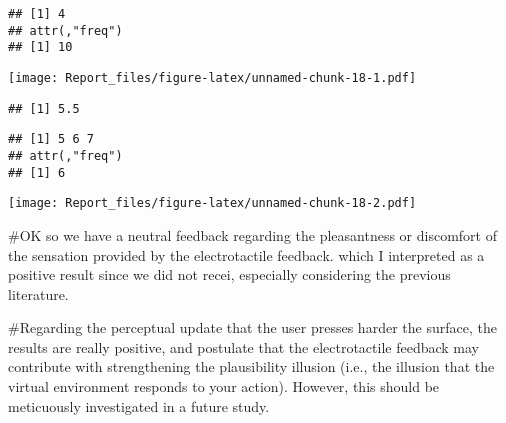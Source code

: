 \documentclass[
]{article}
\newenvironment{Shaded}{\begin{snugshade}}{\end{snugshade}}
\newcommand{\CommentTok}[1]{\textcolor[rgb]{0.56,0.35,0.01}{\textit{#1}}}
\newcommand{\KeywordTok}[1]{\textcolor[rgb]{0.13,0.29,0.53}{\textbf{#1}}}
\newcommand{\NormalTok}[1]{#1}
\newcommand{\OperatorTok}[1]{\textcolor[rgb]{0.81,0.36,0.00}{\textbf{#1}}}
\begin{document}
\begin{verbatim}
## [1] 4
## attr(,"freq")
## [1] 10
\end{verbatim}

\begin{Shaded}
\end{Shaded}

\texttt{[image: Report\_files/figure-latex/unnamed-chunk-18-1.pdf]}

\begin{Shaded}
\end{Shaded}

\begin{verbatim}
## [1] 5.5
\end{verbatim}

\begin{Shaded}
\end{Shaded}

\begin{verbatim}
## [1] 5 6 7
## attr(,"freq")
## [1] 6
\end{verbatim}

\begin{Shaded}
\end{Shaded}

\texttt{[image: Report\_files/figure-latex/unnamed-chunk-18-2.pdf]}

\#OK so we have a neutral feedback regarding the pleasantness or
discomfort of the sensation provided by the electrotactile feedback.
which I interpreted as a positive result since we did not recei,
especially considering the previous literature.

\#Regarding the perceptual update that the user presses harder the
surface, the results are really positive, and postulate that the
electrotactile feedback may contribute with strengthening the
plausibility illusion (i.e., the illusion that the virtual environment
responds to your action). However, this should be meticuously
investigated in a future study.
\end{document}

